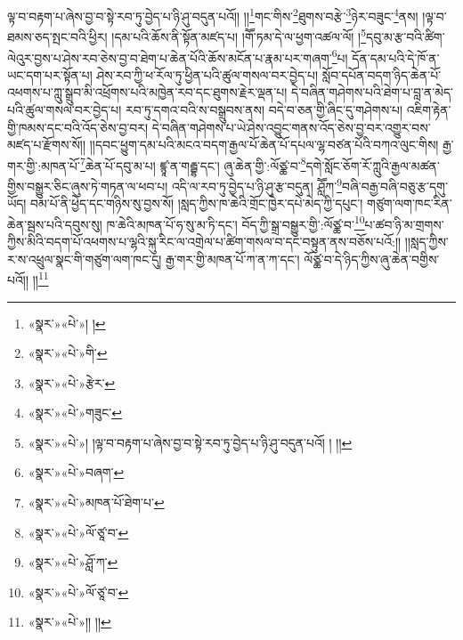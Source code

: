 ལྟ་བ་བརྟག་པ་ཞེས་བྱ་བ་སྟེ་རབ་ཏུ་བྱེད་པ་ཉི་ཤུ་བདུན་པའོ།། །།\footnote{«སྣར་»«པེ་»། །}གང་གིས་\footnote{«སྣར་»«པེ་»གི་}ཐུགས་བརྩེ་\footnote{«སྣར་»«པེ་»རྩེར་}ཉེར་བཟུང་\footnote{«སྣར་»«པེ་»གཟུང་}ནས། །ལྟ་བ་ཐམས་ཅད་སྤང་བའི་ཕྱིར། །དམ་པའི་ཆོས་ནི་སྟོན་མཛད་པ། །གཽ་ཏམ་དེ་ལ་ཕྱག་འཚལ་ལོ། །\footnote{«སྣར་»«པེ་»། །ལྟ་བ་བརྟག་པ་ཞེས་བྱ་བ་སྟེ་རབ་ཏུ་བྱེད་པ་ཉི་ཤུ་བདུན་པའོ། ། །།}དབུ་མ་རྩ་བའི་ཚིག་ལེའུར་བྱས་པ་ཤེས་རབ་ཅེས་བྱ་བ་ཐེག་པ་ཆེན་པོའི་ཆོས་མངོན་པ་རྣམ་པར་གཞག་\footnote{«སྣར་»«པེ་»བཞག་}པ། དོན་དམ་པའི་དེ་ཁོ་ན་ཡང་དག་པར་སྟོན་པ། ཤེས་རབ་ཀྱི་ཕ་རོལ་ཏུ་ཕྱིན་པའི་ཚུལ་གསལ་བར་བྱེད་པ། སློབ་དཔོན་བདག་ཉིད་ཆེན་པོ་འཕགས་པ་ཀླུ་སྒྲུབ་མི་འཕྲོགས་པའི་མཁྱེན་རབ་དང་ཐུགས་རྗེར་ལྡན་པ། དེ་བཞིན་གཤེགས་པའི་ཐེག་པ་བླ་ན་མེད་པའི་ཚུལ་གསལ་བར་བྱེད་པ། རབ་ཏུ་དགའ་བའི་ས་བསྒྲུབས་ནས། བདེ་བ་ཅན་གྱི་ཞིང་དུ་གཤེགས་པ། འཇིག་རྟེན་གྱི་ཁམས་དང་བའི་འོད་ཅེས་བྱ་བར། དེ་བཞིན་གཤེགས་པ་ཡེ་ཤེས་འབྱུང་གནས་འོད་ཅེས་བྱ་བར་འགྱུར་བས་མཛད་པ་རྫོགས་སོ།། །།དབང་ཕྱུག་དམ་པའི་མངའ་བདག་རྒྱལ་པོ་ཆེན་པོ་དཔལ་ལྷ་བཙན་པོའི་བཀའ་ལུང་གིས། རྒྱ་གར་གྱི་:མཁན་པོ་\footnote{«སྣར་»«པེ་»མཁན་པོ་ཐེག་པ་}ཆེན་པོ་དབུ་མ་པ། ཛྙཱ་ན་གརྦྷ་དང་། ཞུ་ཆེན་གྱི་:ལོཙྪ་བ་\footnote{«སྣར་»«པེ་»ལོ་ཙཱ་བ་}དགེ་སློང་ཅོག་རོ་ཀླུའི་རྒྱལ་མཚན་གྱིས་བསྒྱུར་ཅིང་ཞུས་ཏེ་གཏན་ལ་ཕབ་པ། འདི་ལ་རབ་ཏུ་བྱེད་པ་ཉི་ཤུ་རྩ་བདུན། ཤླཽཀ་\footnote{«སྣར་»«པེ་»ཤློ་ཀ་}བཞི་བརྒྱ་བཞི་བཅུ་རྩ་དགུ་ཡོད། བམ་པོ་ནི་ཕྱེད་དང་གཉིས་སུ་བྱས་སོ། །སླད་ཀྱིས་ཁ་ཆེའི་གྲོང་ཁྱེར་དཔེ་མེད་ཀྱི་དཔུང་། གཙུག་ལག་ཁང་རིན་ཆེན་སྦས་པའི་དབུས་སུ། ཁ་ཆེའི་མཁན་པོ་ཧ་སུ་མ་ཏི་དང་། བོད་ཀྱི་སྒྲ་བསྒྱུར་གྱི་:ལོཙྪ་བ་\footnote{«སྣར་»«པེ་»ལོ་ཙཱ་བ་}པ་ཚབ་ཉི་མ་གྲགས་ཀྱིས་མིའི་བདག་པོ་འཕགས་པ་ལྷའི་སྐུ་རིང་ལ་འགྲེལ་པ་ཚིག་གསལ་བ་དང་བསྟུན་ནས་བཅོས་པའོ:།། །།སླད་ཀྱིས་ར་ས་འཕྲུལ་སྣང་གི་གཙུག་ལག་ཁང་དུ། རྒྱ་གར་གྱི་མཁན་པོ་ཀ་ན་ཀ་དང་། ལོཙྪ་བ་དེ་ཉིད་ཀྱིས་ཞུ་ཆེན་བགྱིས་པའོ།། །།\footnote{«སྣར་»«པེ་»།། །།}